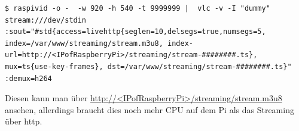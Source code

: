 \documentclass[12pt,a4paper,titlepage]{scrartcl} %
\begin{document}
\ttfamily
\begin{lstlisting}[breaklines]
$ raspivid -o -  -w 920 -h 540 -t 9999999 |  vlc -v -I "dummy" stream:///dev/stdin :sout="#std{access=livehttp{seglen=10,delsegs=true,numsegs=5, index=/var/www/streaming/stream.m3u8, index-url=http://<IPofRaspberryPi>/streaming/stream-########.ts}, mux=ts{use-key-frames}, dst=/var/www/streaming/stream-########.ts}" :demux=h264
\end{lstlisting}

\normalfont
Diesen kann man über \url{http://<IPofRaspberryPi>/streaming/stream.m3u8} ansehen, allerdings braucht dies noch mehr CPU auf dem Pi als das Streaming über http.
\end{document}
